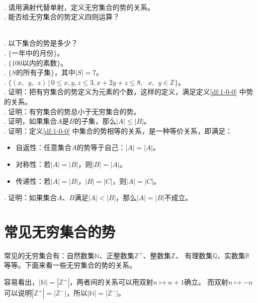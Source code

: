 \documentclass[12pt,UTF8]{ctexbook}
\begin{document}
\begin{sk}
    \mbox{} \\
    . 请用满射代替单射，定义无穷集合的势的关系。\\
    . 能否给无穷集合的势定义四则运算？
\end{sk}

\begin{xt}
    \mbox{} \\
    . 以下集合的势是多少？\\
    . $\{\mbox{一年中的月份}\}$。\\ 
    . $\{100\mbox{以内的素数}\}$。\\ 
    . $\{S\mbox{的所有子集}\}$，其中$|S| = 7$。\\ 
    . $\{(x, \;\, y, \;\, z) \, | \, 0 \leqslant x, y, z \leqslant 3, x + 2y + z \leqslant 8,\,\;\, x,\;\, y \in  \mathbb{Z}\}$。\\ 
    . 证明：把有穷集合的势定义为元素的个数，这样的定义，满足定义\ref{df:1-0-0} 中势的关系。\\
    . 证明：有穷集合的势总小于无穷集合的势。\\
    . 证明，如果集合$A$是$B$的子集，那么$|A| \leqslant |B|$。\\
    . 证明：定义\ref{df:1-0-0} 中集合的势相等的关系，是一种等价关系，即满足：
    \indent \begin{itemize}
        \item 自返性：任意集合$A$的势等于自己：$|A| = |A|$。
        \item 对称性：若$|A| = |B|$，则$|B| = |A|$。
        \item 传递性：若$|A| = |B|$，$|B| = |C|$，则$|A| = |C|$。
    \end{itemize}

    . 证明：如果集合$A$、$B$满足$|A| < |B|$，那么$|A| = |B|$不成立。

\end{xt}

\section{常见无穷集合的势}

常见的无穷集合有：自然数集$\mathbb{N}$、正整数集$\mathbb{Z}^+$、整数集$\mathbb{Z}$、
有理数集$\mathbb{Q}$、实数集$\mathbb{R}$等等。下面来看一些无穷集合的势的关系。

容易看出，$|\mathbb{N}| = |\mathbb{Z}^+|$，两者间的关系可以用双射$n\mapsto n + 1$确立。
而双射$n \mapsto -n$可以说明$|\mathbb{Z}^+| = |\mathbb{Z}^-|$，所以$|\mathbb{N}| = |\mathbb{Z}^-|$。
\end{document}
